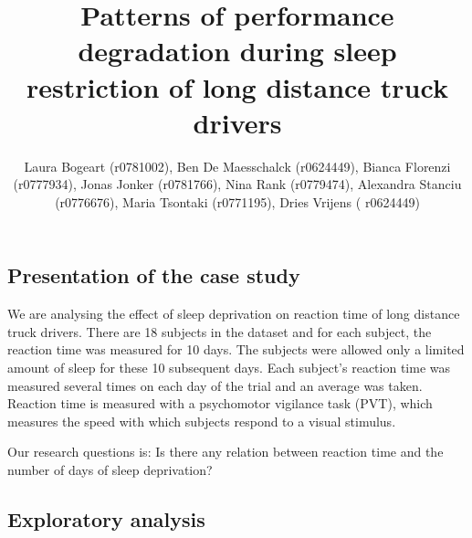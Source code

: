 \documentclass[
]{article}
\title{Patterns of performance degradation during sleep restriction of
long distance truck drivers}
\author{Laura Bogeart (r0781002), Ben De Maesschalck (r0624449), Bianca Florenzi (r0777934), Jonas Jonker (r0781766), Nina Rank (r0779474), Alexandra Stanciu (r0776676), Maria Tsontaki (r0771195), Dries Vrijens ( r0624449)}
\date{}
\begin{document}
\maketitle

\hypertarget{presentation-of-the-case-study}{%
\subsection{Presentation of the case
study}\label{presentation-of-the-case-study}}

We are analysing the effect of sleep deprivation on reaction time of
long distance truck drivers. There are 18 subjects in the dataset and
for each subject, the reaction time was measured for 10 days. The
subjects were allowed only a limited amount of sleep for these 10
subsequent days. Each subject's reaction time was measured several times
on each day of the trial and an average was taken. Reaction time is
measured with a psychomotor vigilance task (PVT), which measures the
speed with which subjects respond to a visual stimulus.

Our research questions is: Is there any relation between reaction time
and the number of days of sleep deprivation?

\hypertarget{exploratory-analysis}{%
\subsection{Exploratory analysis}\label{exploratory-analysis}}
\end{document}

